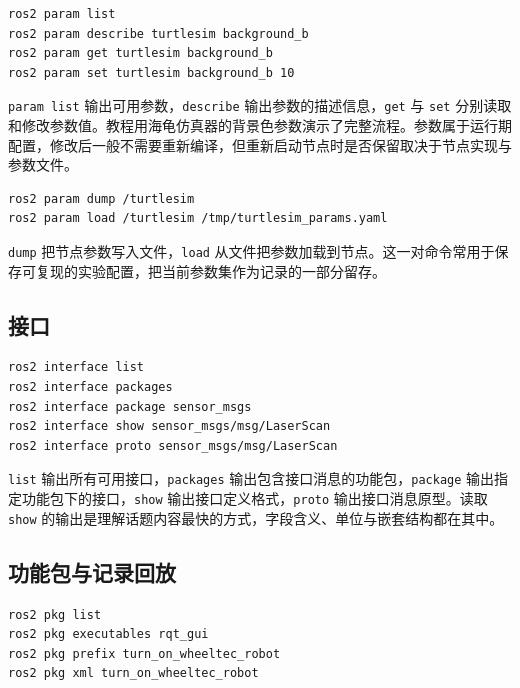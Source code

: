 \begin{lstlisting}[language=bash]
ros2 param list
ros2 param describe turtlesim background_b
ros2 param get turtlesim background_b
ros2 param set turtlesim background_b 10
\end{lstlisting}

\passthrough{\lstinline!param list!}
输出可用参数，\passthrough{\lstinline!describe!}
输出参数的描述信息，\passthrough{\lstinline!get!} 与
\passthrough{\lstinline!set!}
分别读取和修改参数值。教程用海龟仿真器的背景色参数演示了完整流程。参数属于运行期配置，修改后一般不需要重新编译，但重新启动节点时是否保留取决于节点实现与参数文件。

\begin{lstlisting}[language=bash]
ros2 param dump /turtlesim
ros2 param load /turtlesim /tmp/turtlesim_params.yaml
\end{lstlisting}

\passthrough{\lstinline!dump!}
把节点参数写入文件，\passthrough{\lstinline!load!}
从文件把参数加载到节点。这一对命令常用于保存可复现的实验配置，把当前参数集作为记录的一部分留存。

\subsection{接口}\label{ux63a5ux53e3}

\begin{lstlisting}[language=bash]
ros2 interface list
ros2 interface packages
ros2 interface package sensor_msgs
ros2 interface show sensor_msgs/msg/LaserScan
ros2 interface proto sensor_msgs/msg/LaserScan
\end{lstlisting}

\passthrough{\lstinline!list!}
输出所有可用接口，\passthrough{\lstinline!packages!}
输出包含接口消息的功能包，\passthrough{\lstinline!package!}
输出指定功能包下的接口，\passthrough{\lstinline!show!}
输出接口定义格式，\passthrough{\lstinline!proto!} 输出接口消息原型。读取
\passthrough{\lstinline!show!}
的输出是理解话题内容最快的方式，字段含义、单位与嵌套结构都在其中。

\subsection{功能包与记录回放}\label{ux529fux80fdux5305ux4e0eux8bb0ux5f55ux56deux653e}

\begin{lstlisting}[language=bash]
ros2 pkg list
ros2 pkg executables rqt_gui
ros2 pkg prefix turn_on_wheeltec_robot
ros2 pkg xml turn_on_wheeltec_robot
\end{lstlisting}

